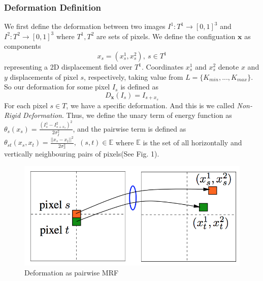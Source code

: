\documentclass{article} %
\begin{document}
	\subsubsection{Deformation Definition} We first define the deformation between two images $I^1:T^1 \to [0,1]^3$ and $I^2:T^2\to[0,1]^3$ where $T^1, T^2$ are sets of pixels. We define the configuation $\mathbf{x}$ as components
	\begin{equation}
	 	x_s = (x_s^1, x_s^2),\ s\in T^1
	\end{equation} 
	representing a 2D displacement field over $T^1$. Coordinates $x_s^1$ and $x_s^2$ denote $x$ and $y$ displacements of pixel $s$, respectively, taking value from $L = \{K_{min},...,K_{max}\}$. So our deformation for some pixel $I_s$ is defined as 
	\begin{equation}
		D_{\mathbf{x}}(I_s) = I_{s+x_s}
	\end{equation}
	For each pixel $s\in T$, we have a specific deformation. And this is we called \emph{Non-Rigid Deformation}. Thus, we define the unary term of energy function as $\displaystyle{\theta_s(x_s) = \frac{(I_s^1 - I_{s+x_s}^2)^2}{2\sigma_I^2}}$, and the pairwise term is defined as $\displaystyle{\theta_{st}(x_s, x_t) = \frac{||x_s-x_t||^2}{2\sigma_x^2},\ (s,t)\in\mathbb{E}}$ where $\mathbb{E}$ is the set of all horizontally and vertically neighbouring pairs of pixels(See Fig. 1).
	\begin{figure}[!hbp]
	\centering
	\includegraphics[scale = 0.75]{energy.png}
	\caption{Deformation as pairwise MRF}
	\end{figure}
\end{document}

